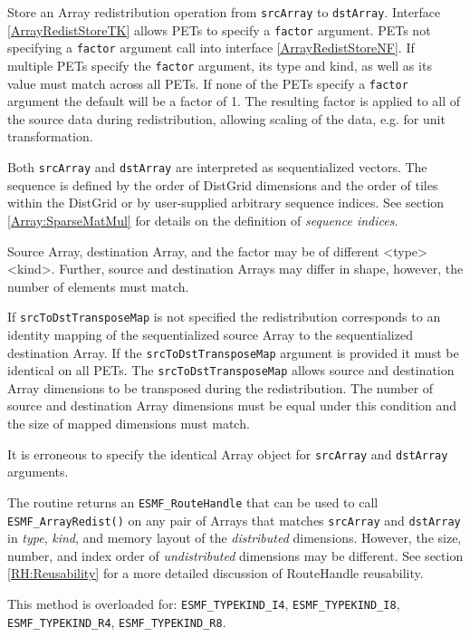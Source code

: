    Store an Array redistribution operation from {\tt srcArray} to {\tt dstArray}.
   Interface \ref{ArrayRedistStoreTK} allows PETs to specify a {\tt factor}
   argument. PETs not specifying a {\tt factor} argument call into interface
   \ref{ArrayRedistStoreNF}. If multiple PETs specify the {\tt factor} argument,
   its type and kind, as well as its value must match across all PETs. If none
   of the PETs specify a {\tt factor} argument the default will be a factor of
   1. The resulting factor is applied to all of the source data during
   redistribution, allowing scaling of the data, e.g. for unit transformation.
    
   Both {\tt srcArray} and {\tt dstArray} are interpreted as sequentialized 
   vectors. The sequence is defined by the order of DistGrid dimensions and the
   order of tiles within the DistGrid or by user-supplied arbitrary sequence
   indices. See section \ref{Array:SparseMatMul} for details on the definition
   of {\em sequence indices}.
  
   Source Array, destination Array, and the factor may be of different
   <type><kind>. Further, source and destination Arrays may differ in shape,
   however, the number of elements must match. 
    
   If {\tt srcToDstTransposeMap} is not specified the redistribution corresponds
   to an identity mapping of the sequentialized source Array to the
   sequentialized destination Array. If the {\tt srcToDstTransposeMap}
   argument is provided it must be identical on all PETs. The
   {\tt srcToDstTransposeMap} allows source and destination Array dimensions to
   be transposed during the redistribution. The number of source and destination
   Array dimensions must be equal under this condition and the size of mapped
   dimensions must match.
    
   It is erroneous to specify the identical Array object for {\tt srcArray} and
   {\tt dstArray} arguments. 
  
     The routine returns an {\tt ESMF\_RouteHandle} that can be used to call 
     {\tt ESMF\_ArrayRedist()} on any pair of Arrays that matches 
     {\tt srcArray} and {\tt dstArray} in {\em type}, {\em kind}, and 
     memory layout of the {\em distributed} dimensions. However, the size,
     number, and index order of {\em undistributed} dimensions may be different.
     See section \ref{RH:Reusability} for a more detailed discussion of
     RouteHandle reusability.
  
   This method is overloaded for:\newline
   {\tt ESMF\_TYPEKIND\_I4}, {\tt ESMF\_TYPEKIND\_I8},\newline 
   {\tt ESMF\_TYPEKIND\_R4}, {\tt ESMF\_TYPEKIND\_R8}.
   \newline
    
